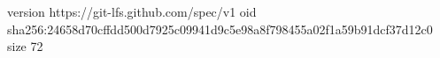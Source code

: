 version https://git-lfs.github.com/spec/v1
oid sha256:24658d70cffdd500d7925c09941d9c5e98a8f798455a02f1a59b91dcf37d12c0
size 72
